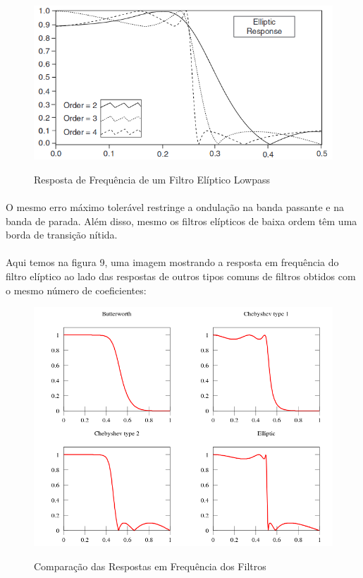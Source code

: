 \documentclass[12pt,fleqn]{article}
\begin{document}
\begin{figure}[!htb]
    \centering
    \includegraphics[scale=0.6]{fig/figura8.png}
    \label{figura:figura4}
    \caption{Resposta de Frequência de um Filtro Elíptico Lowpass}
\end{figure}

\paragraph{} O mesmo erro máximo tolerável restringe a ondulação na banda passante e na banda de parada. Além disso, mesmo os filtros elípticos de baixa ordem têm uma borda de transição nítida.
\newpage
\paragraph{} Aqui temos na figura 9, uma imagem mostrando a resposta em frequência do filtro elíptico ao lado das respostas de outros tipos comuns de filtros obtidos com o mesmo número de coeficientes: 

\begin{figure}[!htb]
    \centering
    \includegraphics[scale=0.6]{fig/figura9.png}
    \label{figura:figura5}
    \caption{Comparação das Respostas em Frequência dos Filtros}
\end{figure}
\end{document}
